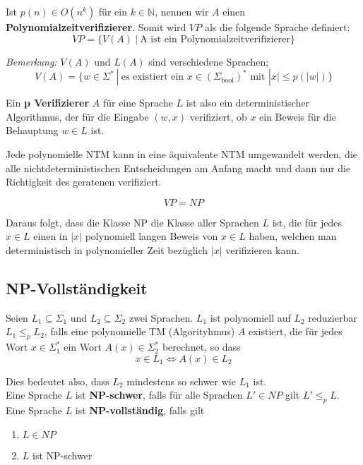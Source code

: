 \documentclass[11pt]{article}
\begin{document}
Ist $p(n) \in O(n^k)$ f{\"u}r ein $k \in \mathbb{N}$, nennen wir $A$ einen \textbf{Polynomialzeitverifizierer}. Somit wird $VP$ als die folgende Sprache definiert:
\begin{equation*}
	VP = \{V(A)\ |\ \text{A ist ein Polynomialzeitverifizierer}\}
\end{equation*}

\emph{Bemerkung:} $V(A)$ und $L(A)$ sind verschiedene Sprachen;
\begin{equation*}
	V(A) = \{ w \in \Sigma^*\ |\ \text{es existiert ein } x \in (\Sigma_\text{bool})^* \text{ mit } |x| \leq p(|w|) \}
\end{equation*}

Ein \textbf{p Verifizierer} $A$ f{\"u}r eine Sprache $L$ ist also ein deterministischer Algorithmus, der f{\"u}r die Eingabe $(w,x)$ verifiziert, ob $x$ ein Beweis f{\"u}r die Behauptung $w \in L$ ist.

Jede polynomielle NTM kann in eine {\"a}quivalente NTM umgewandelt werden, die alle nichtdeterministischen Entscheidungen am Anfang macht und dann nur die Richtigkeit des geratenen verifiziert.

\begin{equation*}
	VP = NP
\end{equation*}

Daraus folgt, dass die Klasse NP die Klasse aller Sprachen $L$ ist, die f{\"u}r jedes $x \in L$ einen in $|x|$ polynomiell langen Beweis von $x \in L$ haben, welchen man deterministisch in polynomieller Zeit bez{\"u}glich $|x|$ verifizieren kann. 

\subsection{NP-Vollst{\"a}ndigkeit}

Seien $L_1 \subseteq \Sigma_1$ und $L_2 \subseteq \Sigma_2$ zwei Sprachen. $L_1$ ist polynomiell auf $L_2$ reduzierbar $L_1 \leq_p L_2$, falls eine polynomielle TM (Algorityhmus) $A$ existiert, die f{\"u}r jedes Wort $x \in \Sigma^*_1$ ein Wort $A(x) \in \Sigma^*_2$ berechnet, so dass
\begin{equation*}
	x \in L_1 \Leftrightarrow A(x) \in L_2
\end{equation*}

Dies bedeutet also, dass $L_2$ mindestens so schwer wie $L_1$ ist. \\

Eine Sprache $L$ ist \textbf{NP-schwer}, falls f{\"u}r alle Sprachen $L' \in NP$ gilt $L' \leq_p L$. 
Eine Sprache $L$ ist \textbf{NP-vollst{\"a}ndig}, falls gilt
\begin{enumerate}[label=(\roman*), noitemsep]
	\item $L \in NP$
	\item $L$ ist NP-schwer
\end{enumerate}
\end{document}
